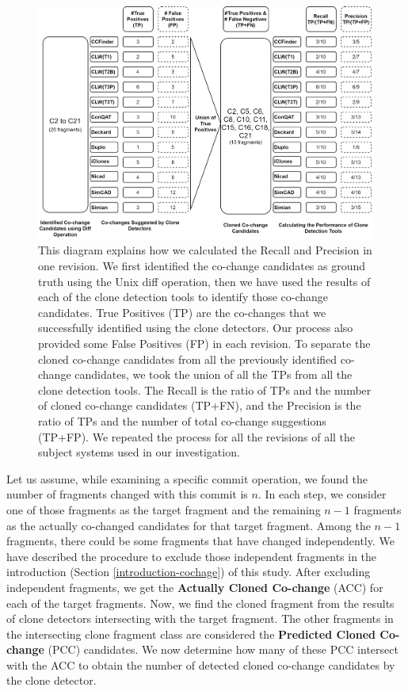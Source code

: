 \documentclass[review]{elsarticle}
\begin{document}
\vspace{4mm}
\begin{figure}
\centering
\includegraphics[width=\columnwidth] {CalculatingCC.jpg}
\caption{This diagram explains how we calculated the Recall and Precision in one revision. We first identified the co-change candidates as ground truth using the Unix diff operation, then we have used the results of each of the clone detection tools to identify those co-change candidates. True Positives (TP) are the co-changes that we successfully identified using the clone detectors. Our process also provided some False Positives (FP) in each revision. To separate the cloned co-change candidates from all the previously identified co-change candidates, we took the union of all the TPs from all the clone detection tools. The Recall is the ratio of TPs and the number of cloned co-change candidates (TP+FN), and the Precision is the ratio of TPs and the number of total co-change suggestions (TP+FP). We repeated the process for all the revisions of all the subject systems used in our investigation.}
\label{fig:CalculatingCC}
\end{figure}

Let us assume, while examining a specific commit operation, we found the number of fragments changed with this commit is $n$. In each step, we consider one of those fragments as the target fragment and the remaining $n-1$ fragments as the actually co-changed candidates for that target fragment. Among the $n-1$ fragments, there could be some fragments that have changed independently. We have described the procedure to exclude those independent fragments in the introduction (Section \ref{introduction-cochage}) of this study. After excluding independent fragments, we get the \textbf{Actually Cloned Co-change} (ACC) for each of the target fragments. Now, we find the cloned fragment from the results of clone detectors intersecting with the target fragment. The other fragments in the intersecting clone fragment class are considered the \textbf{Predicted Cloned Co-change} (PCC) candidates. We now determine how many of these PCC intersect with the ACC to obtain the number of detected cloned co-change candidates by the clone detector. 
\end{document}
